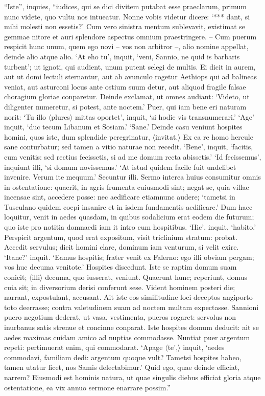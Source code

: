 ``Iste'', inquies, ``iudices, qui se dici divitem putabat esse praeclarum, primum nunc videte, quo vultu nos intueatur. Nonne vobis videtur dicere: `*** dant, si mihi molesti non essetis?' Cum vero sinistra mentum sublevavit, existimat se gemmae nitore et auri splendore aspectus omnium praestringere. – Cum puerum respicit hunc unum, quem ego novi – vos non arbitror –, alio nomine appellat, deinde alio atque alio. `At eho tu', inquit, `veni, Sannio, ne quid is barbaris turbent'; ut ignoti, qui audient, unum putent selegi de multis. Ei dicit in aurem, aut ut domi lectuli sternantur, aut ab avunculo rogetur Aethiops qui ad balineas veniat, aut asturconi locus ante ostium suum detur, aut aliquod fragile falsae choragium gloriae conparetur. Deinde exclamat, ut omnes audiant: `Videto, ut diligenter numeretur, si potest, ante noctem.' Puer, qui iam bene eri naturam norit: `Tu illo $\langle$plures$\rangle$ mittas oportet', inquit, `si hodie vis transnumerari.' `Age' inquit, `duc tecum Libanum et Sosiam.' `Sane.' Deinde casu veniunt hospites homini, quos iste, dum splendide peregrinatur, $\langle$invitat.$\rangle$ Ex ea re homo hercule sane conturbatur; sed tamen a vitio naturae non recedit. `Bene', inquit, `facitis, cum venitis: sed rectius fecissetis, si ad me domum recta abissetis.' `Id fecissemus', inquiunt illi, `si domum novissemus.' `At istud quidem facile fuit undelibet invenire. Verum ite mequum.' Secuntur illi. Sermo interea huius consumitur omnis in ostentatione: quaerit, in agris frumenta cuiusmodi sint; negat se, quia villae incensae sint, accedere posse: nec aedificare etiamnunc audere; `tametsi in Tusculano quidem coepi insanire et in isdem fundamentis aedificare.' Dum haec loquitur, venit in aedes quasdam, in quibus sodalicium erat eodem die futurum; quo iste pro notitia domnaedi iam it intro cum hospitibus. `Hic', inquit, `habito.' Perspicit argentum, quod erat expositum, visit triclinium stratum: probat. Accedit servulus; dicit homini clare, dominum iam venturum, si velit exire. `Itane?' inquit. `Eamus hospitis; frater venit ex Falerno: ego illi obviam pergam; vos huc decuma venitote.' Hospites discedunt. Iste se raptim domum suam conicit; $\langle$illi$\rangle$ decuma, quo iusserat, veniunt. Quaerunt hunc; reperiunt, domus cuia sit; in diversorium derisi conferunt sese. Vident hominem posteri die; narrant, expostulant, accusant. Ait iste eos similitudine loci deceptos angiporto toto deerrasse; contra valetudinem suam ad noctem multam expectasse. Sannioni puero negotium dederat, ut vasa, vestimenta, pueros rogaret: servolus non inurbanus satis strenue et concinne conparat. Iste hospites domum deducit: ait se aedes maximas cuidam amico ad nuptias commodasse. Nuntiat puer argentum repeti: pertimuerat enim, qui commodarat. `Apage $\langle$te',$\rangle$ inquit, `aedes commodavi, familiam dedi: argentum quoque vult? Tametsi hospites habeo, tamen utatur licet, nos Samis delectabimur.' Quid ego, quae deinde efficiat, narrem? Eiusmodi est hominis natura, ut quae singulis diebus efficiat gloria atque ostentatione, ea vix annuo sermone enarrare possim.''


